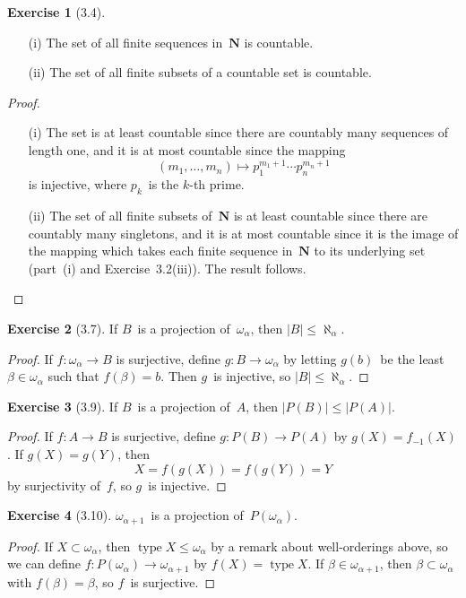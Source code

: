 \documentclass[letterpaper,12pt]{article}
\newcommand{\N}{\boldsymbol{N}}
\renewcommand{\P}{P}
\DeclareMathOperator{\type}{type}
\newcommand{\preimage}[1]{#1_{-1}}
\newcommand{\card}[1]{|#1|}
\theoremstyle{definition}
\newtheorem*{exer}{Exercise}
\theoremstyle{remark}
\begin{document}
\begin{exer}[3.4]\
\begin{enumerate}[itemsep=0pt]
\item[(i)] The set of all finite sequences in~\(\N\) is countable.
\item[(ii)] The set of all finite subsets of a countable set is countable.
\end{enumerate}
\end{exer}
\begin{proof}\
\begin{enumerate}[itemsep=0pt]
\item[(i)] The set is at least countable since there are countably many sequences of length one, and it is at most countable since the mapping
\[(m_1,\ldots,m_n)\mapsto p_1^{m_1+1}\cdots p_n^{m_n+1}\]
is injective, where \(p_k\)~is the \(k\)-th prime.
\item[(ii)] The set of all finite subsets of~\(\N\) is at least countable since there are countably many singletons, and it is at most countable since it is the image of the mapping which takes each finite sequence in~\(\N\) to its underlying set (part~(i) and Exercise~3.2(iii)). The result follows.\qedhere
\end{enumerate}
\end{proof}

\begin{exer}[3.7]
If \(B\)~is a projection of~\(\omega_{\alpha}\), then \(\card{B}\le\aleph_{\alpha}\).
\end{exer}
\begin{proof}
If \(f:\omega_{\alpha}\to B\) is surjective, define \(g:B\to\omega_{\alpha}\) by letting \(g(b)\)~be the least \(\beta\in\omega_{\alpha}\) such that \(f(\beta)=b\). Then \(g\)~is injective, so \(\card{B}\le\aleph_{\alpha}\).
\end{proof}

\begin{exer}[3.9]
If \(B\)~is a projection of~\(A\), then \(\card{\P(B)}\le\card{\P(A)}\).
\end{exer}
\begin{proof}
If \(f:A\to B\) is surjective, define \(g:\P(B)\to\P(A)\) by \(g(X)=\preimage{f}(X)\). If \(g(X)=g(Y)\), then
\[X=f(g(X))=f(g(Y))=Y\]
by surjectivity of~\(f\), so \(g\)~is injective.
\end{proof}

\begin{exer}[3.10]
\(\omega_{\alpha+1}\)~is a projection of~\(\P(\omega_{\alpha})\).
\end{exer}
\begin{proof}
If \(X\subset\omega_{\alpha}\), then \(\type X\le\omega_{\alpha}\) by a remark about well-orderings above, so we can define \(f:\P(\omega_{\alpha})\to\omega_{\alpha+1}\) by \(f(X)=\type X\). If \(\beta\in\omega_{\alpha+1}\), then \(\beta\subset\omega_{\alpha}\) with \(f(\beta)=\beta\), so \(f\)~is surjective.
\end{proof}
\end{document}
